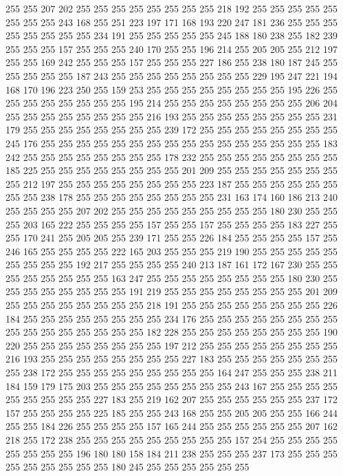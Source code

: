 255 255 207 202 255 255 255 255 255 255 255 255 218 192 255 255 255 255 255 255
255 255 243 168 255 251 223 197 171 168 193 220 247 181 236 255 255 255 255 255
255 255 255 234 191 255 255 255 255 255 245 188 180 238 255 182 239 255 255 255
157 255 255 255 240 170 255 255 196 214 255 205 205 255 212 197 255 255 169 242
255 255 255 157 255 255 255 227 186 255 238 180 187 245 255 255 255 255 255 187
243 255 255 255 255 255 255 255 255 229 195 247 221 194 168 170 196 223 250 255
159 253 255 255 255 255 255 255 255 255 195 226 255 255 255 255 255 255 255 255
195 214 255 255 255 255 255 255 255 255 206 204 255 255 255 255 255 255 255 255
216 193 255 255 255 255 255 255 255 255 231 179 255 255 255 255 255 255 255 255
239 172 255 255 255 255 255 255 255 255 245 176 255 255 255 255 255 255 255 255
255 255 255 255 255 255 255 255 183 242 255 255 255 255 255 255 255 255 178 232
255 255 255 255 255 255 255 255 185 225 255 255 255 255 255 255 255 255 201 209
255 255 255 255 255 255 255 255 212 197 255 255 255 255 255 255 255 255 223 187
255 255 255 255 255 255 255 255 238 178 255 255 255 255 255 255 255 255 231 163
174 160 186 213 240 255 255 255 255 207 202 255 255 255 255 255 255 255 255 255
180 230 255 255 255 203 165 222 255 255 255 255 157 255 255 157 255 255 255 255
183 227 255 255 170 241 255 205 205 255 239 171 255 255 226 184 255 255 255 255
157 255 246 165 255 255 255 255 222 165 203 255 255 255 219 190 255 255 255 255
255 255 255 255 255 192 217 255 255 255 255 240 213 187 161 172 167 230 255 255
255 255 255 255 255 255 163 247 255 255 255 255 255 255 255 255 180 230 255 255
255 255 255 255 255 255 191 219 255 255 255 255 255 255 255 255 201 209 255 255
255 255 255 255 255 255 218 191 255 255 255 255 255 255 255 255 226 184 255 255
255 255 255 255 255 255 234 176 255 255 255 255 255 255 255 255 255 255 255 255
255 255 255 255 182 228 255 255 255 255 255 255 255 255 190 220 255 255 255 255
255 255 255 255 197 212 255 255 255 255 255 255 255 255 216 193 255 255 255 255
255 255 255 255 227 183 255 255 255 255 255 255 255 255 238 172 255 255 255 255
255 255 255 255 255 164 247 255 255 255 238 211 184 159 179 175 203 255 255 255
255 255 255 255 255 243 167 255 255 255 255 255 255 255 255 255 227 183 255 219
162 207 255 255 255 255 255 255 237 172 157 255 255 255 255 225 185 255 255 243
168 255 255 205 205 255 255 166 244 255 255 184 226 255 255 255 255 157 165 244
255 255 255 255 255 255 207 162 218 255 172 238 255 255 255 255 255 255 255 255
255 157 254 255 255 255 255 255 255 255 255 196 180 180 158 184 211 238 255 255
255 237 173 255 255 255 255 255 255 255 255 255 180 245 255 255 255 255 255 255
